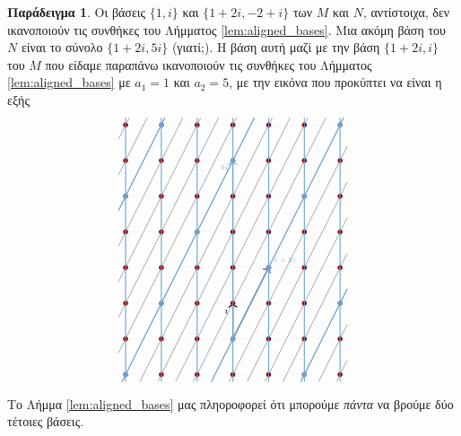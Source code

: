 \documentclass[12pt,a4paper,reqno]{amsart}
\theoremstyle{definition}
\newtheorem{example}[theorem]{Παράδειγμα}
\theoremstyle{remark}
\numberwithin{theorem}{section}
\numberwithin{exercise}{section}
\numberwithin{equation}{section}
\begin{document}
\begin{example}
    Οι βάσεις $\{1, i\}$ και $\{1+2i, -2+i\}$ των $M$ και $N$, αντίστοιχα, δεν ικανοποιούν τις συνθήκες του Λήμματος \ref{lem:aligned_bases}. Μια ακόμη βάση του $N$ είναι το σύνολο $\{1+2i,5i\}$ (γιατί;). Η βάση αυτή μαζί με την βάση $\{1+2i, i\}$ του $M$ που είδαμε παραπάνω ικανοποιούν τις συνθήκες του Λήμματος \ref{lem:aligned_bases} με $a_1 = 1$ και $a_2 = 5$, με την εικόνα που προκύπτει να είναι η εξής 
    \[
    \begin{tikzpicture}[scale=1]
        \draw[step=1cm, gray!10, thin] (-3.2,-1.2) grid (3.2,6.2);

        \draw[->, thick] (0,0) -- (1,2) node[below left] {};
        \draw[->, thick] (0,0) -- (0,1) node[below left] {\scriptsize{$i$}};

        \draw[->, iceberg, thick] (0,0) -- (1,2) node[above right] {\tiny{$1+2i$}};
        \draw[->, iceberg, thick] (0,0) -- (0,5) node[below left] {\tiny{$5i$}};

        \foreach \x in {-3,-2,-1,0,1,2,3}
            \foreach \y in {-1,0,1,2,3,4,5,6}
            \fill[darkcandyapplered] (\x,\y) circle (2pt);

        \fill[iceberg] (1,2) circle (2pt);
        \fill[iceberg] (2,4) circle (2pt);
        \fill[iceberg] (3,6) circle (2pt);
        \fill[iceberg] (0,0) circle (2pt);
        \fill[iceberg] (3,1) circle (2pt);
        \fill[iceberg] (2,-1) circle (2pt);
        \fill[iceberg] (-2,1) circle (2pt);
        \fill[iceberg] (-1,3) circle (2pt);
        \fill[iceberg] (0,5) circle (2pt);
        \fill[iceberg] (-3,-1) circle (2pt);
        \fill[iceberg] (-3,4) circle (2pt);
        \fill[iceberg] (-2,6) circle (2pt);

        \foreach \x in {-3,-2,-1,0,1,2,3}
            \draw[iceberg,thick] (\x,-1.2)--(\x,6.2);
        \foreach \x in {0,1,2,3,4,5}
            \draw[black!60] (-3.1+.5*\x,-1.2)--(0.6+.5*\x,6.2);
        \foreach \x in {0,1,2,3,4,5,6}
            \draw[black!60] (-.1+.5*\x,-1.2)--(3.2,5.4-1*\x);
        \foreach \x in {0,1,2,3,4,5,6}
            \draw[black!60] (-3.2,-.4+1*\x)--(.1-.5*\x,6.2);
        
        \foreach \x in {0,5}
            \draw[iceberg,thick] (-3.1+.5*\x,-1.2)--(0.6+.5*\x,6.2);
        \foreach \x in {4}
            \draw[iceberg,thick] (-.1+.5*\x,-1.2)--(3.2,5.4-1*\x);
        \foreach \x in {4}
            \draw[iceberg,thick] (-3.2,-.4+1*\x)--(.1-.5*\x,6.2);
    \end{tikzpicture}
    \]
    Το Λήμμα \ref{lem:aligned_bases} μας πληοροφορεί ότι μπορούμε \emph{πάντα} να βρούμε δύο τέτοιες βάσεις.
\end{example}
\end{document}
